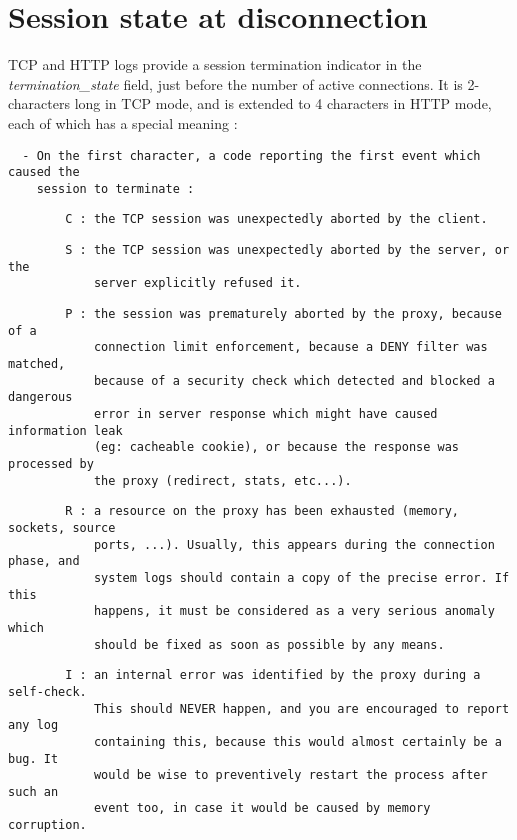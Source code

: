 
\section{Session state at disconnection}

TCP and HTTP logs provide a session termination indicator in the
\emph{termination\_state} field, just before the number of active connections. It is
2-characters long in TCP mode, and is extended to 4 characters in HTTP mode,
each of which has a special meaning :

\begin{verbatim}
  - On the first character, a code reporting the first event which caused the
    session to terminate :
\end{verbatim}

\begin{verbatim}
        C : the TCP session was unexpectedly aborted by the client.
\end{verbatim}

\begin{verbatim}
        S : the TCP session was unexpectedly aborted by the server, or the
            server explicitly refused it.
\end{verbatim}

\begin{verbatim}
        P : the session was prematurely aborted by the proxy, because of a
            connection limit enforcement, because a DENY filter was matched,
            because of a security check which detected and blocked a dangerous
            error in server response which might have caused information leak
            (eg: cacheable cookie), or because the response was processed by
            the proxy (redirect, stats, etc...).
\end{verbatim}

\begin{verbatim}
        R : a resource on the proxy has been exhausted (memory, sockets, source
            ports, ...). Usually, this appears during the connection phase, and
            system logs should contain a copy of the precise error. If this
            happens, it must be considered as a very serious anomaly which
            should be fixed as soon as possible by any means.
\end{verbatim}

\begin{verbatim}
        I : an internal error was identified by the proxy during a self-check.
            This should NEVER happen, and you are encouraged to report any log
            containing this, because this would almost certainly be a bug. It
            would be wise to preventively restart the process after such an
            event too, in case it would be caused by memory corruption.
\end{verbatim}

